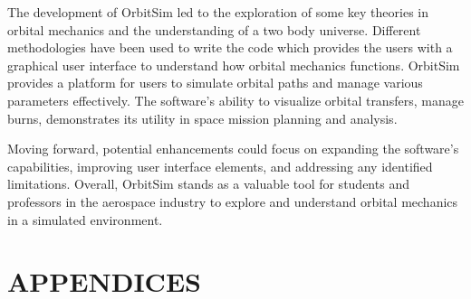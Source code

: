 \documentclass[12pt, letter]{article}
\begin{document}
The development of OrbitSim led to the exploration of some key theories in orbital mechanics and the understanding of a two body universe. Different methodologies have been used to write the code which provides the users with a graphical user interface to understand how orbital mechanics functions.
OrbitSim provides a platform for users to simulate orbital paths and manage various parameters effectively. The software's ability to visualize orbital transfers, manage burns, demonstrates its utility in space mission planning and analysis.

Moving forward, potential enhancements could focus on expanding the software's capabilities, improving user interface elements, and addressing any identified limitations. Overall, OrbitSim stands as a valuable tool for students and professors in the aerospace industry to explore and understand orbital mechanics in a simulated environment.

\clearpage
%
%
\appendix
\section*{APPENDICES}
\end{document}
